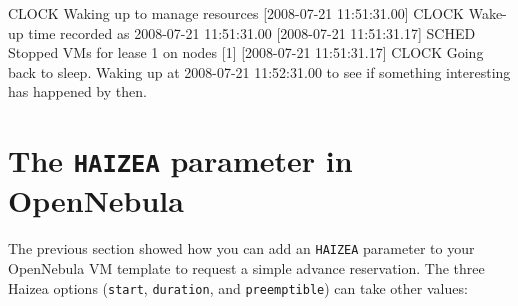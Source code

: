 \begin{wideshellverbatim}
[2008-07-21 11:51:31.00] CLOCK   Waking up to manage resources
[2008-07-21 11:51:31.00] CLOCK   Wake-up time recorded as 2008-07-21 11:51:31.00
[2008-07-21 11:51:31.17] SCHED   Stopped VMs for lease 1 on nodes [1]
[2008-07-21 11:51:31.17] CLOCK   Going back to sleep. 
                                 Waking up at 2008-07-21 11:52:31.00 
                                 to see if something interesting has happened by then.
\end{wideshellverbatim}

\section{The \texttt{HAIZEA} parameter in OpenNebula}

The previous section showed how you can add an \texttt{HAIZEA} parameter to your OpenNebula VM template to request a simple advance reservation. The three Haizea options (\texttt{start}, \texttt{duration}, and \texttt{preemptible}) can take other values:


